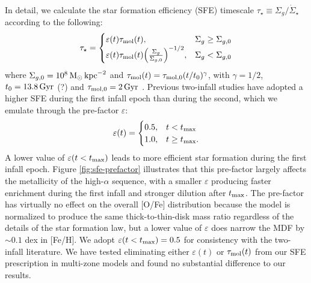 \documentclass[twocolumn,twocolappendix,linenumbers]{aastex631}
\newcommand{\todo}[1]{{\color{red}#1}}
\begin{document}
In detail, we calculate the star formation efficiency (SFE) timescale $\tau_\star\equiv\Sigma_g/\dot\Sigma_\star$ according to the following:
\begin{equation}
    \label{eq:sf-law}
    \tau_\star = 
    \begin{cases}
        \varepsilon(t) \tau_{\rm mol}(t),   & \Sigma_g \ge \Sigma_{g,0} \\
        \varepsilon(t) \tau_{\rm mol}(t) \Big(\frac{\Sigma_g}{\Sigma_{g,0}}\Big)^{-1/2}, & \Sigma_g < \Sigma_{g,0}
    \end{cases}
\end{equation}
where $\Sigma_{g,0} = 10^8\,{\rm M}_\odot\,{\rm kpc}^{-2}$ and $\tau_{\rm mol}(t)=\tau_{\rm mol,0}(t/t_0)^\gamma$, with $\gamma=1/2$, $t_0=13.8\,{\rm Gyr}$ \todo{(?)} and $\tau_{\rm mol,0}=2\,{\rm Gyr}$ \citet{leroy_star_2008}. Previous two-infall studies \citep[e.g.,][]{nissen_high-precision_2020} have adopted a higher SFE during the first infall epoch than during the second, which we emulate through the pre-factor $\varepsilon$:
\begin{equation}
    \label{eq:sfe-prefactor}
    \varepsilon(t) = 
    \begin{cases}
        0.5, & t < t_{\rm max} \\
        1.0, & t \ge t_{\rm max}.
    \end{cases}
\end{equation}
A lower value of $\varepsilon(t<t_{\rm max})$ leads to more efficient star formation during the first infall epoch. Figure \ref{fig:sfe-prefactor} illustrates that this pre-factor largely affects the metallicity of the high-$\alpha$ sequence, with a smaller $\varepsilon$ producing faster enrichment during the first infall and stronger dilution after $t_{\rm max}$. The pre-factor has virtually no effect on the overall [O/Fe] distribution because the model is normalized to produce the same thick-to-thin-disk mass ratio regardless of the details of the star formation law, but a lower value of $\varepsilon$ does narrow the MDF by $\sim0.1$ dex in [Fe/H]. We adopt $\varepsilon(t<t_{\rm max})=0.5$ for consistency with the two-infall literature. We have tested eliminating either $\varepsilon(t)$ or $\tau_{\rm mol}(t)$ from our SFE prescription in multi-zone models and found no substantial difference to our results.
\end{document}
